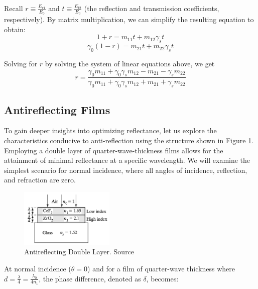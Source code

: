 Recall $r \equiv \frac{E_{r1}}{E_0}$ and $t \equiv \frac{E_{t2}}{E_0}$ (the reflection and transmission coefficients, respectively). By matrix multiplication, we can simplify the resulting equation to obtain: %
    \begin{equation}
    1 + r = m_{11}t + m_{12}\gamma_st
    \end{equation}
    \begin{equation}
    \gamma_0(1 - r) = m_{21}t + m_{22}\gamma_st
    \end{equation}

Solving for $r$ by solving the system of linear equations above, we get
    \begin{equation}\label{reflection coefficient in terms of transfer matrix terms}
    r=\frac{\gamma_0m_{11} + \gamma_0\gamma_sm_{12} - m_{21} - \gamma_sm_{22}}{\gamma_0m_{11} + \gamma_0\gamma_sm_{12} + m_{21} + \gamma_sm_{22}}
    \end{equation}

\subsection{Antireflecting Films}
To gain deeper insights into optimizing reflectance, let us explore the characteristics conducive to anti-reflection using the structure shown in Figure \ref{Sample Antireflecting Double Layer}. Employing a double layer of quarter-wave-thickness films allows for the attainment of minimal reflectance at a specific wavelength. We will examine the simplest scenario for normal incidence, where all angles of incidence, reflection, and refraction are zero.

\begin{figure}[ht!]
  \centering
  \includegraphics[width=0.4\textwidth]{Chapters/Figures/Chapter 2 Figures/Antireflecting Double Layer.jpeg}
  \caption{Antireflecting Double Layer. Source \cite{pedrotti_introduction_2007}}
  \label{Sample Antireflecting Double Layer}
\end{figure}

At normal incidence ($\theta=0$) and for a film of quarter-wave thickness where $d=\frac{\lambda}{4}=\frac{\lambda_0}{4n_1}$, the phase difference, denoted as $\delta$, becomes: 


